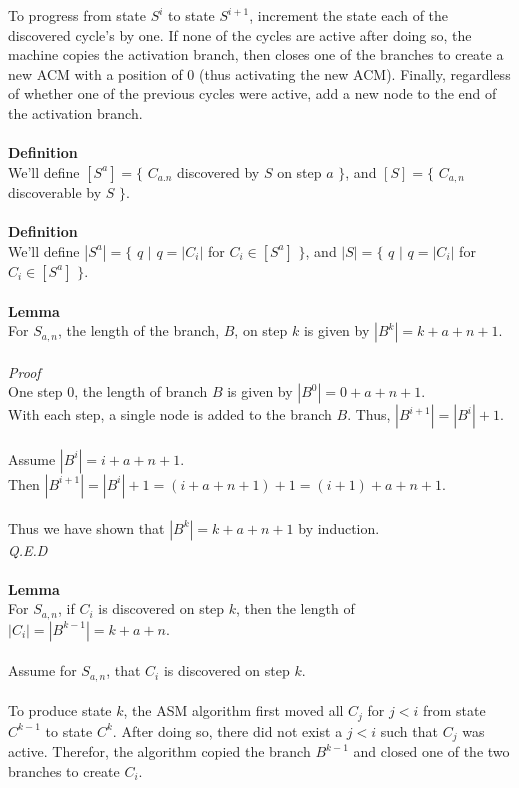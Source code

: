 \documentclass[a4paper,12pt]{article}
\begin{document}
To progress from state $S^i$ to state $S^{i+1}$, increment the state each of the discovered cycle's by one. If none of the cycles are active after doing so, the machine copies the activation branch, then closes one of the branches to create a new ACM with a position of $0$ (thus activating the new ACM). Finally, regardless of whether one of the previous cycles were active, add a new node to the end of the activation branch.\\
\\
\textbf{Definition}\\  
We'll define $[S^a] = \{$ $C_{a.n}$ discovered by $S$ on step $a$ $\}$, and $[S] = \{$ $C_{a,n}$ discoverable by $S$ $\}$.\\
\\
\textbf{Definition}\\  
We'll define $|S^a| = \{$ $q$ $|$ $q =  |C_i|$ for $C_i \in [S^a]$ $\}$, and $|S| = \{$ $q$ $|$ $q =  |C_i|$ for $C_i \in [S^a]$ $\}$.\\
\\
\textbf{Lemma}\\
For $S_{a,n}$, the length of the branch, $B$, on step $k$ is given by $|B^k| = k + a + n + 1$.\\
\\
\textit{Proof}\\  
One step $0$, the length of branch $B$ is given by $|B^0| = 0 + a + n + 1$.\\
With each step, a single node is added to the branch $B$. Thus, $|B^{i+1}| = |B^{i}| + 1$.\\
\\
Assume $|B^{i}| = i + a + n + 1$.\\
Then $|B^{i+1}| = |B^{i}| + 1 = (i + a + n + 1) + 1 = (i + 1) + a + n + 1$.\\
\\
Thus we have shown that $|B^k| = k + a + n + 1$ by induction.\\
\textit{Q.E.D}\\
\\
\textbf{Lemma}\\
For $S_{a,n}$, if $C_i$ is discovered on step $k$, then the length of $|C_i| = |B^{k-1}| = k + a + n$.\\
\\
Assume for $S_{a,n}$, that $C_i$ is discovered on step $k$.\\
\\
To produce state $k$, the ASM algorithm first moved all $C_j$ for $j < i$ from state $C^{k-1}$ to state $C^k$. After doing so, there did not exist a $j < i$ such that $C_j$ was active. Therefor, the algorithm copied the branch $B^{k-1}$ and closed one of the two branches to create $C_i$.\\
\end{document}
